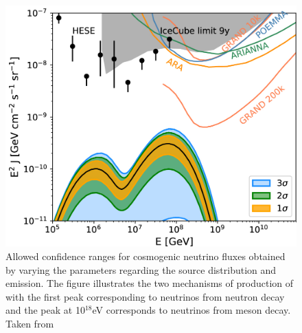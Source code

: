 \begin{figure}[t!]
  \centering
  \includegraphics[width=14.5cm]{thesis_figures/CRnNu/apjab05cef9_hr.jpg}
  \caption{Allowed confidence ranges for cosmogenic neutrino fluxes obtained by varying the parameters regarding the source distribution and emission. The figure illustrates the two mechanisms of production of with the first peak corresponding to neutrinos from neutron decay and the peak at 10$^{18}$eV corresponds to neutrinos from meson decay. Taken from~\cite{Heinze:2019jou}}
  \label{fig:model_nu_auger_mixed}
\end{figure}

